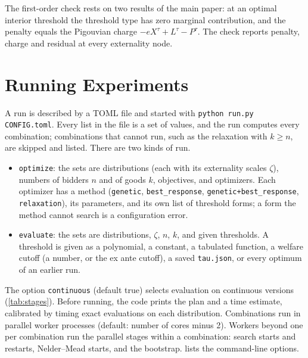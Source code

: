 \documentclass[11pt]{article}
\newcommand{\code}[1]{\texttt{#1}}
\begin{document}
The first-order check rests on two results of the main paper: at an optimal interior threshold the threshold type has zero marginal contribution, and the penalty equals the Pigouvian charge $-eX^\tau+L^\tau-P^\tau$. The check reports penalty, charge and residual at every externality node.

\section{Running Experiments}\label{sec:running}

A run is described by a TOML file and started with \code{python run.py CONFIG.toml}. Every list in the file is a set of values, and the run computes every combination; combinations that cannot run, such as the relaxation with $k\geq n$, are skipped and listed. There are two kinds of run.
\begin{itemize}
    \item \code{optimize}: the sets are distributions (each with its externality scales $\zeta$), numbers of bidders $n$ and of goods $k$, objectives, and optimizers. Each optimizer has a method (\code{genetic}, \code{best\_response}, \code{genetic+best\_response}, \code{relaxation}), its parameters, and its own list of threshold forms; a form the method cannot search is a configuration error.
    \item \code{evaluate}: the sets are distributions, $\zeta$, $n$, $k$, and given thresholds. A threshold is given as a polynomial, a constant, a tabulated function, a welfare cutoff (a number, or the ex ante cutoff), a saved \code{tau.json}, or every optimum of an earlier run.
\end{itemize}
The option \code{continuous} (default true) selects evaluation on continuous versions (\cref{tab:stages}). Before running, the code prints the plan and a time estimate, calibrated by timing exact evaluations on each distribution. Combinations run in parallel worker processes (default: number of cores minus 2). Workers beyond one per combination run the parallel stages within a combination: search starts and restarts, Nelder--Mead starts, and the bootstrap.  lists the command-line options.
\end{document}
